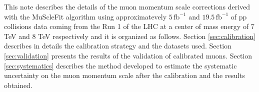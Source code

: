 This note describes the details of the muon momentum scale corrections derived with the MuScleFit 
algorithm using approximatevely $5\,\mathrm{fb}^{-1}$ and $19.5\,\mathrm{fb}^{-1}$ of pp 
collisions data coming from the Run 1 of the LHC at a center of mass energy 
of 7 TeV and 8 TeV respectively and it is organized as follows. Section \ref{sec:calibration} describes 
in details the calibration strategy and the datasets used. Section \ref{sec:validation} presents the 
results of the validation of calibrated muons. Section \ref{sec:systematics} describes the method developed to estimate the systematic uncertainty on the muon momentum scale after the calibration and the results obtained.



